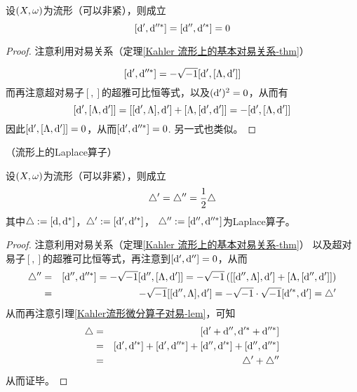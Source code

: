 \begin{lemma}
\label{Kahler流形微分算子对易-lem}
设$(X,\omega)$为\Kahler 流形（可以非紧），则成立
$$[\mathrm{d}',\mathrm{d}''^*]=[\mathrm{d}'',\mathrm{d}'^*]=0$$
\end{lemma}

\begin{proof}注意利用对易关系（定理\ref{Kahler 流形上的基本对易关系-thm}）

$$
  [\mathrm{d}',\mathrm{d}''^*]
=
  -\sqrt{-1}[\mathrm{d}',[\Lambda,\mathrm{d}']]
$$
而再注意超对易子$[,]$的超雅可比恒等式，以及$(\mathrm{d}')^2=0$，从而有
$$
  [\mathrm{d}',[\Lambda,\mathrm{d}']]
=
  [[\mathrm{d}',\Lambda],\mathrm{d}']+[\Lambda,[\mathrm{d}',\mathrm{d}']]
=
  -[\mathrm{d}',[\Lambda,\mathrm{d}']]
$$
因此$[\mathrm{d}',[\Lambda,\mathrm{d}']]=0$，从而$[\mathrm{d}',\mathrm{d}''^*]=0$.
另一式也类似。
\end{proof}

\begin{prop}（\Kahler 流形上的Laplace算子）

设$(X,\omega)$为\Kahler 流形（可以非紧），则成立
$$
  \triangle'=\triangle''=\frac{1}{2}\triangle
$$
其中$\triangle:=[\mathrm{d},\mathrm{d}^*]$，$\triangle':=[\mathrm{d}',\mathrm{d}'^*]$，
$\triangle'':=[\mathrm{d}'',\mathrm{d}''^*]$为Laplace算子。
\end{prop}

\begin{proof}
注意利用对易关系（定理\ref{Kahler 流形上的基本对易关系-thm}）
以及超对易子$[,]$的超雅可比恒等式，再注意到$[\mathrm{d}',\mathrm{d}'']=0$，从而
\begin{eqnarray*}
     \triangle''
&=&
     [\mathrm{d}'',\mathrm{d}''^*]
=
     -\sqrt{-1}[\mathrm{d}'',[\Lambda,\mathrm{d}']]
=
     -\sqrt{-1}\left(
       [[\mathrm{d}'',\Lambda],\mathrm{d}']+[\Lambda,[\mathrm{d}'',\mathrm{d}']]
     \right)\\
&=&
     -\sqrt{-1}[[\mathrm{d}'',\Lambda],\mathrm{d}']
=
     -\sqrt{-1}\cdot\sqrt{-1}[\mathrm{d}'^*,\mathrm{d}']
=
     \triangle'
\end{eqnarray*}
从而再注意引理\ref{Kahler流形微分算子对易-lem}，可知
\begin{eqnarray*}
     \triangle
&=&
     [\mathrm{d}'+\mathrm{d}'',\mathrm{d}'^*+\mathrm{d}''^*]\\
&=&
     [\mathrm{d}',\mathrm{d}'^*]
    +[\mathrm{d}',\mathrm{d}''^*]
    +[\mathrm{d}'',\mathrm{d}'^*]
    +[\mathrm{d}'',\mathrm{d}''^*]\\
&=&
    \triangle'+\triangle''
\end{eqnarray*}
从而证毕。
\end{proof}


